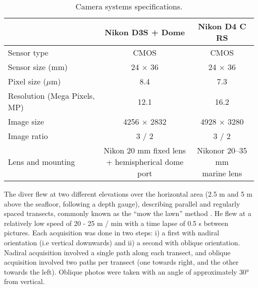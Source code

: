 \begin{table}[H]
  \centering
  \normalsize
  \caption{Camera systems specifications.}
  \label{table2.1}
    \begin{tabular}{lcc} %
        \toprule
        \textbf{}	& \textbf{Nikon D3S + Dome}	& \textbf{Nikon D4 C RS}\\
        \midrule
        Sensor type		& CMOS			& CMOS\\
        Sensor size (mm)		& 24 $\times$ 36			& 24 $\times$ 36\\
        Pixel size ($\mu$m)     & 8.4       & 7.3\\
        Resolution (Mega Pixels, MP)		& 12.1			& 16.2\\
        Image size		& 4256 $\times$ 2832			& 4928 $\times$ 3280\\
        Image ratio		& 3 / 2			& 3 / 2\\
        Lens and mounting		& \makecell[c]{Nikon 20 mm fixed lens \\ + hemispherical
        dome port}			& \makecell[c]{Nikonor 20–35 mm \\ marine lens}\\
        \bottomrule
    \end{tabular}
\end{table}

The diver flew at two different elevations over the horizontal area (2.5 m and 5 m above the seafloor, following a depth gauge), describing parallel and regularly spaced transects, commonly known as the “mow the lawn” method \citep{pizarro_simple_2017}. He flew at a relatively low speed of 20 - 25 m / min with a time lapse of 0.5 s between pictures. Each acquisition was done in two steps: i) a first with nadiral orientation (i.e vertical downwards) and ii) a second with oblique orientation. Nadiral acquisition involved a single path along each transect, and oblique acquisition involved two paths per transect (one towards right, and the other towards the left). Oblique photos were taken with an angle of approximately 30° from vertical.

